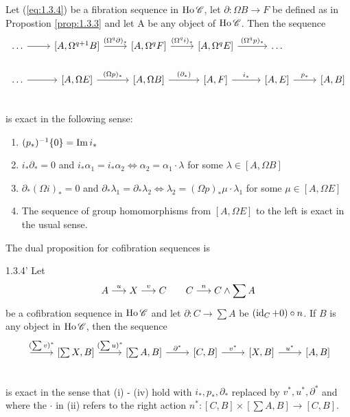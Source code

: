 \documentclass[../main]{subfiles}
\begin{document}
\begin{proposition} \label{prop:1.3.4}
    Let (\ref{eq:1.3.4}) be a fibration sequence in $\operatorname{Ho} \mathscr{C}$, let $\partial : \Omega B \longrightarrow F$ be defined as in Propostion \ref{prop:1.3.3} and let A be any object of $\operatorname{Ho} \mathscr{C}$.  Then the sequence
\[
\begin{tikzcd}
    \dots \arrow[r]
        & {[A, \Omega^{q+1}B]} \arrow[r, "(\Omega^q\partial)_*"]
            & {[A, \Omega^q F]} \arrow[r, "(\Omega^q i)_*"]
                & {[A, \Omega^q E]} \arrow[r, "(\Omega^q p)_*"]
                    & \dots \\
    \dots \arrow[r]
        & {[A, \Omega E]} \arrow[r, "(\Omega p)_*"]
            & {[A, \Omega B]} \arrow[r, "(\partial_*)"]
                & {[A, F]} \arrow[r, "i_*"]
                    & {[A, E]} \arrow[r, "p_*"]
                        & {[A,B]} \\
\end{tikzcd}
\]
is exact in the following sense:
\begin{enumerate}[label=(\roman*)]
  \item $(p_*)^{-1}\{0\} = \operatorname{Im} i_*$
  \item $i_*\partial_* = 0$ and $i_* \alpha_1 = i_*\alpha_2 \iff \alpha_2 = \alpha_1 \cdot \lambda $ for some $\lambda \in [A, \Omega B]$
  \item $\partial_* (\Omega i)_* = 0$ and $\partial_* \lambda_1 = \partial_* \lambda_2 \iff \lambda_2 = (\Omega p)_* \mu \cdot \lambda_1$ for some $\mu \in [A, \Omega E]$
  \item The sequence of group homomorphisms from $[A, \Omega E]$ to the left is exact in the usual sense.
\end{enumerate}

\end{proposition}

The dual proposition for cofibration sequences is

\begin{customprop}{1.3.4'} \label{prop:1.3.4'}
    Let \[A \varrightarrow{u} X \varrightarrow{v} C \quad\quad C \varrightarrow{n} C \wedge \sum A\] 
    be a cofibration sequence in $\operatorname{Ho} \mathscr{C}$ and let $\partial:C \longrightarrow \sum A$ be $(\operatorname{id}_C + 0) \circ n$.  If $B$ is any object in $\operatorname{Ho} \mathscr{C}$, then the sequence
    \[
    \begin{tikzcd}
    \arrow[r,"(\sum v)^*"] & {[\sum X, B]} \arrow[r,"(\sum u)^*"] & {[\sum A, B]} \arrow[r,"\partial^*"]
        & {[C,B]} \arrow[r,"v^*"] & {[X,B]} \arrow[r,"u^*"] & {[A,B]} \\
    \end{tikzcd}
    \]
    is exact in the sense that (i) - (iv) hold with $i_*, p_*, \partial_*$ replaced by $v^*,u^*,\partial^*$ and where the $\cdot$ in (ii) refers to the right action $n^*:[C,B] \times [\sum A, B] \longrightarrow [C,B]$.
    \end{customprop}
\end{document}
